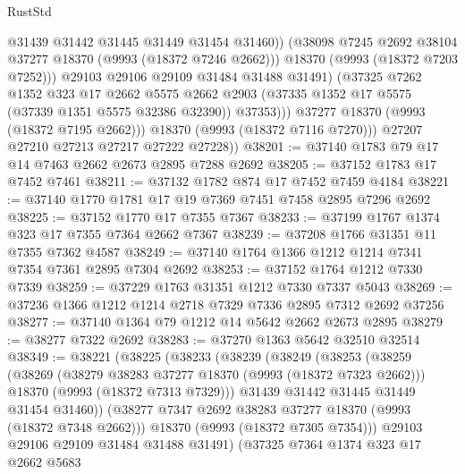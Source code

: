 \begin{lexlean}{RustStd}
\begin{coremodule}
                        @31439
                        @31442
                        @31445
                        @31449
                        @31454
                        @31460))
                    (@38098 @7245 @2692 @38104 @37277 @18370 (@9993 (@18372 @7246 @2662)))
                    @18370
                    (@9993 (@18372 @7203 @7252)))
                  @29103
                  @29106
                  @29109
                  @31484
                  @31488
                  @31491)
                (@37325
                  @7262
                  @1352
                  @323
                  @17
                  @2662
                  @5575
                  @2662
                  @2903
                  (@37335 @1352 @17 @5575 (@37339 @1351 @5575 @32386 @32390))
                  @37353)))
            @37277
            @18370
            (@9993 (@18372 @7195 @2662)))
          @18370
          (@9993 (@18372 @7116 @7270)))
        @27207
        @27210
        @27213
        @27217
        @27222
        @27228))
@38201 := @37140 @1783 @79 @17 @14 @7463 @2662 @2673 @2895 @7288 @2692
@38205 := @37152 @1783 @17 @7452 @7461
@38211 := @37132 @1782 @874 @17 @7452 @7459 @4184
@38221 := @37140 @1770 @1781 @17 @19 @7369 @7451 @7458 @2895 @7296 @2692
@38225 := @37152 @1770 @17 @7355 @7367
@38233 := @37199 @1767 @1374 @323 @17 @7355 @7364 @2662 @7367
@38239 := @37208 @1766 @31351 @11 @7355 @7362 @4587
@38249 := @37140 @1764 @1366 @1212 @1214 @7341 @7354 @7361 @2895 @7304 @2692
@38253 := @37152 @1764 @1212 @7330 @7339
@38259 := @37229 @1763 @31351 @1212 @7330 @7337 @5043
@38269 := @37236 @1366 @1212 @1214 @2718 @7329 @7336 @2895 @7312 @2692 @37256
@38277 := @37140 @1364 @79 @1212 @14 @5642 @2662 @2673 @2895
@38279 := @38277 @7322 @2692
@38283 := @37270 @1363 @5642 @32510 @32514
@38349 := @38221
    (@38225
      (@38233
        (@38239
          (@38249
            (@38253
              (@38259
                (@38269
                  (@38279 @38283 @37277 @18370 (@9993 (@18372 @7323 @2662)))
                  @18370
                  (@9993 (@18372 @7313 @7329)))
                @31439
                @31442
                @31445
                @31449
                @31454
                @31460))
            (@38277 @7347 @2692 @38283 @37277 @18370 (@9993 (@18372 @7348 @2662)))
            @18370
            (@9993 (@18372 @7305 @7354)))
          @29103
          @29106
          @29109
          @31484
          @31488
          @31491)
        (@37325
          @7364
          @1374
          @323
          @17
          @2662
          @5683

\end{coremodule}
\end{lexlean}
